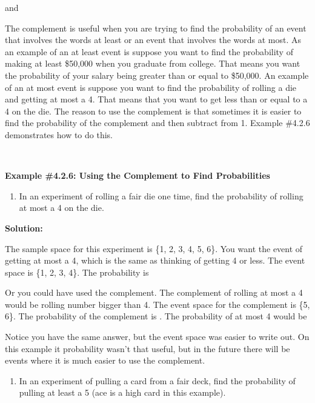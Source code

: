 \documentclass[]{book}
\providecommand{\tightlist}{%
  \setlength{\itemsep}{0pt}\setlength{\parskip}{0pt}}
\begin{document}
and

The complement is useful when you are trying to find the probability of
an event that involves the words at least or an event that involves the
words at most. As an example of an at least event is suppose you want to
find the probability of making at least \$50,000 when you graduate from
college. That means you want the probability of your salary being
greater than or equal to \$50,000. An example of an at most event is
suppose you want to find the probability of rolling a die and getting at
most a 4. That means that you want to get less than or equal to a 4 on
the die. The reason to use the complement is that sometimes it is easier
to find the probability of the complement and then subtract from 1.
Example \#4.2.6 demonstrates how to do this.

\textbf{\\
}

\textbf{Example \#4.2.6: Using the Complement to Find Probabilities}

\begin{enumerate}
\def\labelenumi{\alph{enumi}.}
\tightlist
\item
  In an experiment of rolling a fair die one time, find the
  probability of rolling at most a 4 on the die.
\end{enumerate}

\textbf{Solution:}

The sample space for this experiment is \{1, 2, 3, 4, 5, 6\}. You want
the event of getting at most a 4, which is the same as thinking of
getting 4 or less. The event space is \{1, 2, 3, 4\}. The probability
is

Or you could have used the complement. The complement of rolling at
most a 4 would be rolling number bigger than 4. The event space for
the complement is \{5, 6\}. The probability of the complement is . The
probability of at most 4 would be

Notice you have the same answer, but the event space was easier to
write out. On this example it probability wasn't that useful, but in
the future there will be events where it is much easier to use the
complement.

\begin{enumerate}
\def\labelenumi{\alph{enumi}.}
\setcounter{enumi}{1}
\tightlist
\item
  In an experiment of pulling a card from a fair deck, find the
  probability of pulling at least a 5 (ace is a high card in this
  example).
\end{enumerate}
\end{document}
